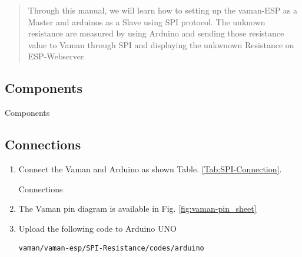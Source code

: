 \begin{abstract}
Through this manual, we will learn how to setting up the vaman-ESP as a Master and  arduinos as a Slave using SPI protocol. The  unknown resistance are measured by using Arduino and sending those  resistance value to Vaman through SPI and displaying the unkwnown Resistance on ESP-Webserver.
\end{abstract}
\subsection{Components}
\begin{table}[!h]
\centering

\caption{Components}
\label{table:SPI-components}
\end{table}

\subsection{Connections}
\begin{enumerate}[label=\thesection.\arabic*.,ref=\thesection.\theenumi]

	

\item
Connect the Vaman and Arduino as shown Table. \ref{Tab:SPI-Connection}.

%
\begin{table}[!ht]
\centering

\caption{Connections}
\label{Tab:SPI-Connection}
\end{table}
\item
The Vaman pin diagram is available in Fig. \ref{fig:vaman-pin_sheet}

\item Upload the following code to Arduino UNO

\begin{lstlisting}
vaman/vaman-esp/SPI-Resistance/codes/arduino
\end{lstlisting}
\end{enumerate}
